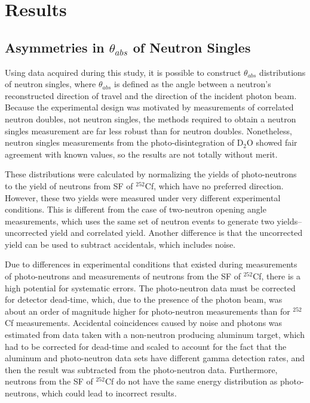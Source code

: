 \chapter{Results}
\section{Asymmetries in $\theta_{abs}$ of Neutron Singles}
Using data acquired during this study, it is possible to construct $\theta_{abs}$ distributions of neutron singles, where $\theta_{abs}$ is defined as the angle between a neutron's reconstructed direction of travel and the direction of the incident photon beam.
Because the experimental design was motivated by measurements of correlated neutron doubles, not neutron singles, the methods required to obtain a neutron singles measurement are far less robust than for neutron doubles.
Nonetheless, neutron singles measurements from the photo-disintegration of D$_{2}$O showed fair agreement with known values, so the results are not totally without merit.

These distributions were calculated by normalizing the yields of photo-neutrons to the yield of neutrons from SF of $^{252}$Cf, which have no preferred direction.
However, these two yields were measured under very different experimental conditions.
This is different from the case of two-neutron opening angle measurements, which uses the same set of neutron events to generate two yields--uncorrected yield and correlated yield.
Another difference is that the uncorrected yield can be used to subtract accidentals, which includes noise.

 Due to differences in experimental conditions that existed during measurements of photo-neutrons and measurements of neutrons from the SF of $^{252}$Cf, there is a high potential for systematic errors.
The photo-neutron data must be corrected for detector dead-time, which, due to the presence of the photon beam, was about an order of magnitude higher for photo-neutron measurements than for $^{252}$Cf measurements.
Accidental coincidences caused by noise and photons was estimated from data taken with a non-neutron producing aluminum target, which had to be corrected for dead-time and scaled to account for the fact that the aluminum and photo-neutron data sets have different gamma detection rates, and then the result was subtracted from the photo-neutron data.
Furthermore, neutrons from the SF of $^{252}$Cf do not have the same energy distribution as photo-neutrons, which could lead to incorrect results.

